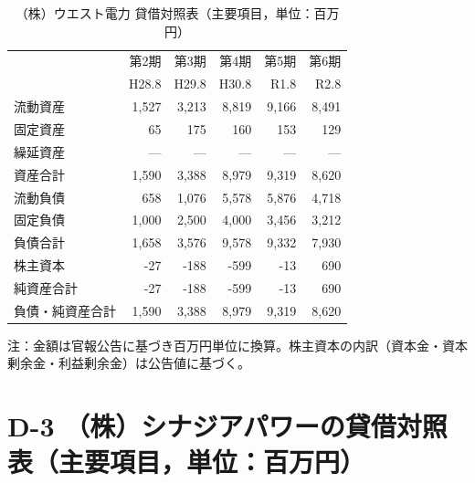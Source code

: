 \begin{table}[H]
\centering
\caption{（株）ウエスト電力 貸借対照表（主要項目，単位：百万円）}
\begin{tabular}{lrrrrr}
\toprule
 & 第2期 & 第3期 & 第4期 & 第5期 & 第6期 \\
 & H28.8 & H29.8 & H30.8 & R1.8 & R2.8 \\
\midrule
流動資産       & 1{,}527 & 3{,}213 & 8{,}819 & 9{,}166 & 8{,}491 \\
固定資産       & 65      & 175     & 160     & 153     & 129 \\
繰延資産       & —       & —       & —       & —       & — \\
\midrule
資産合計       & 1{,}590 & 3{,}388 & 8{,}979 & 9{,}319 & 8{,}620 \\
\midrule
流動負債       & 658     & 1{,}076 & 5{,}578 & 5{,}876 & 4{,}718 \\
固定負債       & 1{,}000 & 2{,}500 & 4{,}000 & 3{,}456 & 3{,}212 \\
負債合計       & 1{,}658 & 3{,}576 & 9{,}578 & 9{,}332 & 7{,}930 \\
\midrule
株主資本       & -27     & -188    & -599    & -13     & 690 \\
純資産合計     & -27     & -188    & -599    & -13     & 690 \\
\midrule
負債・純資産合計 & 1{,}590 & 3{,}388 & 8{,}979 & 9{,}319 & 8{,}620 \\
\bottomrule
\end{tabular}
\end{table}

\begin{flushleft}
\footnotesize
注：金額は官報公告に基づき百万円単位に換算。株主資本の内訳（資本金・資本剰余金・利益剰余金）は公告値に基づく。
\end{flushleft}

\section*{D-3 （株）シナジアパワーの貸借対照表（主要項目，単位：百万円）}

